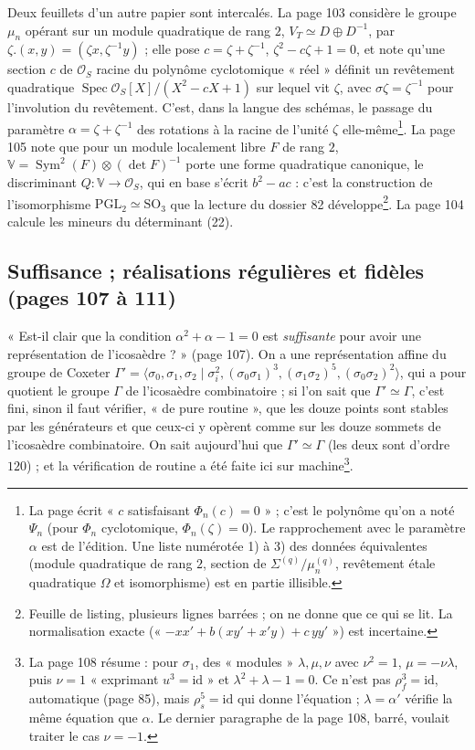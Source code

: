 \documentclass[11pt,a4paper]{article}
\begin{document}
Deux feuillets d'un autre papier sont intercalés. La page 103 considère le
groupe $\mu_n$ opérant sur un module quadratique de rang $2$, $V_T \simeq D \oplus
D^{-1}$, par $\zeta.(x, y) = (\zeta x, \zeta^{-1}y)$ ; elle pose $c = \zeta +
\zeta^{-1}$, $\zeta^2 - c\zeta + 1 = 0$, et note qu'une section $c$ de
$\mathcal{O}_S$ racine du polynôme cyclotomique « réel » définit un revêtement
quadratique $\operatorname{Spec}\mathcal{O}_S[X]/(X^2 - cX + 1)$ sur lequel vit
$\zeta$, avec $\sigma\zeta = \zeta^{-1}$ pour l'involution du revêtement. C'est,
dans la langue des schémas, le passage du paramètre $\alpha = \zeta +
\zeta^{-1}$ des rotations à la racine de l'unité $\zeta$ elle-même\footnote{La
page écrit « $c$ satisfaisant $\Phi_n(c) = 0$ » ; c'est le polynôme qu'on a noté
$\Psi_n$ (pour $\Phi_n$ cyclotomique, $\Phi_n(\zeta) = 0$). Le rapprochement
avec le paramètre $\alpha$ est de l'édition. Une liste numérotée 1) à 3) des
données équivalentes (module quadratique de rang $2$, section de
$\Sigma^{(q)}/\mu_n^{(q)}$, revêtement étale quadratique $\Omega$ et
isomorphisme) est en partie illisible.}. La page 105 note que pour un module
localement libre $F$ de rang $2$, $\mathbb{V} = \operatorname{Sym}^2(F) \otimes
(\det F)^{-1}$ porte une forme quadratique canonique, le discriminant $Q :
\mathbb{V} \to \mathcal{O}_S$, qui en base s'écrit $b^2 - ac$ : c'est la
construction de l'isomorphisme $\mathrm{PGL}_2 \simeq \mathrm{SO}_3$ que la
lecture du dossier 82 développe\footnote{Feuille de listing, plusieurs lignes
barrées ; on ne donne que ce qui se lit. La normalisation exacte (« $-xx' +
b(xy' + x'y) + c\,yy'$ ») est incertaine.}. La page 104 calcule les mineurs du
déterminant (22).

\subsection*{Suffisance ; réalisations régulières et fidèles (pages 107 à 111)}

« Est-il clair que la condition $\alpha^2 + \alpha - 1 = 0$ est \emph{suffisante}
pour avoir une représentation de l'icosaèdre ? » (page 107). On a une
représentation affine du groupe de Coxeter $\Gamma' = \langle \sigma_0,
\sigma_1, \sigma_2 \mid \sigma_i^2, (\sigma_0\sigma_1)^3, (\sigma_1\sigma_2)^5,
(\sigma_0\sigma_2)^2\rangle$, qui a pour quotient le groupe $\Gamma$ de
l'icosaèdre combinatoire ; si l'on sait que $\Gamma' \simeq \Gamma$, c'est
fini, sinon il faut vérifier, « de pure routine », que les douze points sont
stables par les générateurs et que ceux-ci y opèrent comme sur les douze
sommets de l'icosaèdre combinatoire. On sait aujourd'hui que $\Gamma' \simeq
\Gamma$ (les deux sont d'ordre $120$) ; et la vérification de routine a été
faite ici sur machine\footnote{La page 108 résume : pour $\sigma_1$, des
« modules » $\lambda, \mu, \nu$ avec $\nu^2 = 1$, $\mu = -\nu\lambda$, puis $\nu = 1$
« exprimant $u^3 = \mathrm{id}$ » et $\lambda^2 + \lambda - 1 = 0$. Ce n'est pas
$\rho_f^3 = \mathrm{id}$, automatique (page 85), mais $\rho_s^5 = \mathrm{id}$
qui donne l'équation ; $\lambda = \alpha'$ vérifie la même équation que $\alpha$.
Le dernier paragraphe de la page 108, barré, voulait traiter le cas $\nu = -1$.}.
\end{document}
